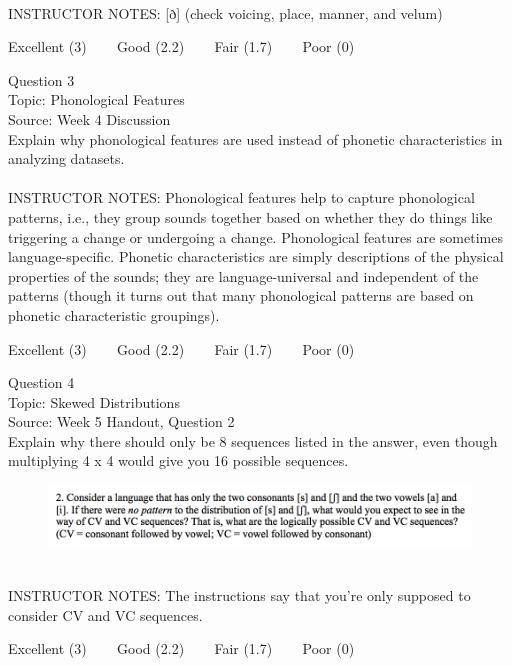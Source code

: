 \documentclass[12pt]{article}
\begin{document}
~\\
INSTRUCTOR NOTES: [ð] (check voicing, place, manner, and velum)


\vfill
Excellent (3) ~~~ Good (2.2) ~~~ Fair (1.7) ~~~ Poor (0)
\newpage

{\large Question 3}\\

Topic: Phonological Features\\
Source: Week 4 Discussion\\

Explain why phonological features are used instead of phonetic characteristics in analyzing datasets.\\


~\\
INSTRUCTOR NOTES: Phonological features help to capture phonological patterns, i.e., they group sounds together based on whether they do things like triggering a change or undergoing a change. Phonological features are sometimes language-specific. Phonetic characteristics are simply descriptions of the physical properties of the sounds; they are language-universal and independent of the patterns (though it turns out that many phonological patterns are based on phonetic characteristic groupings).


\vfill
Excellent (3) ~~~ Good (2.2) ~~~ Fair (1.7) ~~~ Poor (0)
\newpage

{\large Question 4}\\

Topic: Skewed Distributions\\
Source: Week 5 Handout, Question 2\\

Explain why there should only be 8 sequences listed in the answer, even though multiplying 4 x 4 would give you 16 possible sequences.\\

\begin{figure}[H]
\includegraphics{../images/skew2.png}
\end{figure}

~\\
INSTRUCTOR NOTES: The instructions say that you're only supposed to consider CV and VC sequences. 


\vfill
Excellent (3) ~~~ Good (2.2) ~~~ Fair (1.7) ~~~ Poor (0)
\newpage
\end{document}
